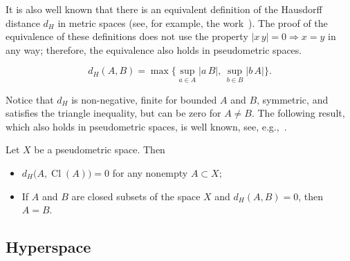 \documentclass{svproc}
\def\Cl{\operatorname{Cl}}
\begin{document}
It is also well known that there is an equivalent definition of the Hausdorff distance $d_H$ in metric spaces (see, for example, the work~\cite[Proposition~5.1]{TuzLections}). The proof of the equivalence of these definitions does not use the property $|x\, y|=0 \Rightarrow x=y$ in any way; therefore, the equivalence also holds in pseudometric spaces.

\begin{definition}\label{distance_H2}
$$
d_H(A, B) = \max\bigl\{\sup\limits_{a\in A} |a\, B|,\, \sup\limits_{b\in B} |b\, A|\bigr\}.
$$
\end{definition}

Notice that $d_H$ is non-negative, finite for bounded $A$ and $B$, symmetric, and satisfies the triangle inequality, but can be zero for $A\ne B$. The following result, which also holds in pseudometric spaces, is well known, see, e.g.,~\cite[Proposition~7.3.3]{Burago}.

\begin{proposition}
Let $X$ be a pseudometric space. Then
\begin{itemize}
\item $d_H\bigl(A, \Cl(A)\bigr) = 0$ for any nonempty $A\subset X;$
\item If $A$ and $B$ are closed subsets of the space $X$ and $d_H(A, B) = 0$, then $A = B.$
\end{itemize}
\end{proposition}


\subsection{Hyperspace}\label{sec:hyperspace}
\end{document}
